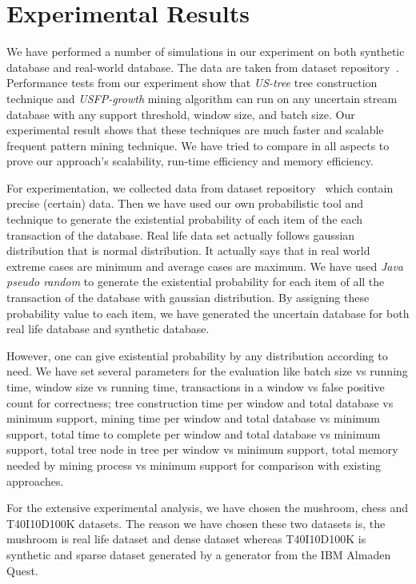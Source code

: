 \documentclass[conference]{IEEEtran}
\begin{document}
\section{Experimental Results}\label{Experiment}
We have performed a number of simulations in our experiment on both synthetic database and real-world database. The data are taken from dataset repository~\cite{dataset}. Performance tests from our experiment show that \emph{US-tree} tree construction technique and \emph{USFP-growth} mining algorithm can run on any uncertain stream database with any support threshold, window size, and batch size. Our experimental result shows that these techniques are much faster and scalable frequent pattern mining technique. We have tried to compare in all aspects to prove our approach's scalability, run-time efficiency and memory efficiency.  

For experimentation, we collected data from dataset repository~\cite{dataset} which contain precise (certain) data. Then we have used our own probabilistic tool and technique to generate the existential probability of each item of the each transaction of the database. Real life data set actually follows gaussian distribution that is normal distribution. It actually says that in real world extreme cases are minimum and average cases are maximum. We have used \emph{Java pseudo random} to generate the existential probability for each item of all the transaction of the database with gaussian distribution. By assigning these probability value to each item, we have generated the uncertain database for both real life database and synthetic database. 

However, one can give existential probability by any distribution according to need. We have set several parameters for the evaluation like batch size vs running time, window size vs running time, transactions in a window vs false positive count for correctness; tree construction time per window and total database vs minimum support, mining time per window and total database vs minimum support, total time to complete per window and total database vs minimum support, total tree node in tree per window vs minimum support, total memory needed by mining process vs minimum support for comparison with existing approaches.

For the extensive experimental analysis, we have chosen the mushroom, chess and T40I10D100K datasets. The reason we have chosen these two datasets is, the mushroom  is real life dataset and dense dataset whereas T40I10D100K  is synthetic and sparse dataset generated by a generator from the IBM Almaden Quest.
     
\end{document}

